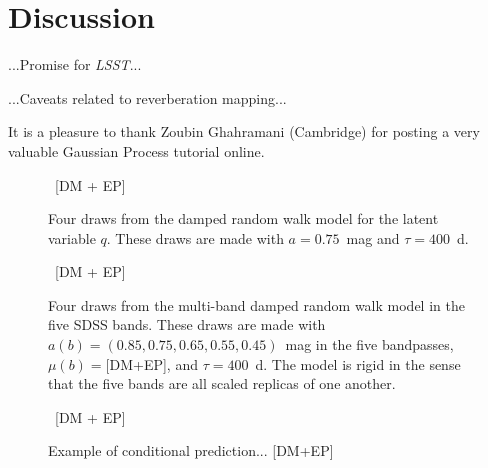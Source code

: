\documentclass[letterpaper,12pt,preprint]{aastex}
\newcommand{\project}[1]{\textsl{#1}}
\newcommand{\lsst}{\project{LSST}}
\begin{document}
\section{Discussion}

...Promise for \lsst...

...Caveats related to reverberation mapping...

It is a pleasure to thank Zoubin Ghahramani (Cambridge) for posting a
very valuable Gaussian Process tutorial online.

\clearpage
\begin{figure}
~[DM + EP]~
\caption{Four draws from the damped random walk model for the latent
  variable $q$.  These draws are made with $a=0.75$~mag and
  $\tau=400$~d.\label{fig:qdraws}}
\end{figure}

\begin{figure}
~[DM + EP]~
\caption{Four draws from the multi-band damped random walk model in
  the five SDSS bands.  These draws are made with $a(b)=(0.85, 0.75,
  0.65, 0.55, 0.45)$~mag in the five bandpasses, $\mu(b)=$[DM+EP], and
  $\tau=400$~d.  The model is rigid in the sense that the five bands
  are all scaled replicas of one another.\label{fig:mdraws}}
\end{figure}

\begin{figure}
~[DM + EP]~
\caption{Example of conditional
  prediction... [DM+EP]\label{fig:conditional}}
\end{figure}
\end{document}
